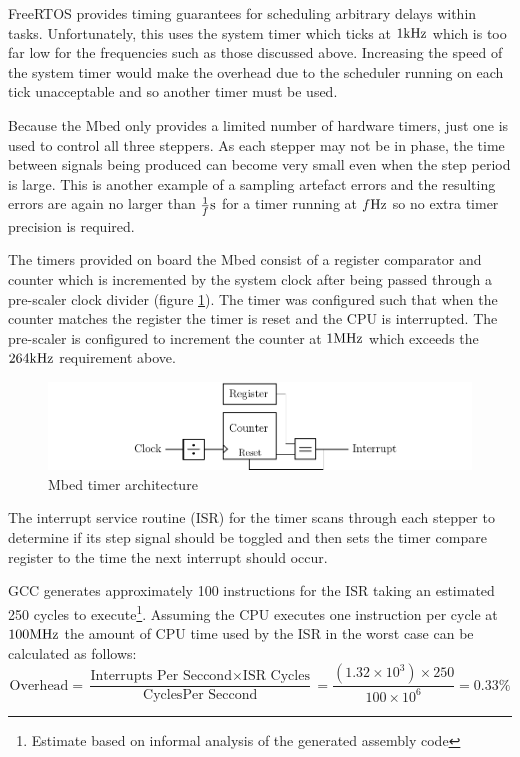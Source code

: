 				FreeRTOS provides timing guarantees for scheduling arbitrary delays
				within tasks. Unfortunately, this uses the system timer which
				ticks at $1\textrm{kHz}$ which is too far low for the frequencies such as those
				discussed above. Increasing the speed of the system timer would make the
				overhead due to the scheduler running on each tick unacceptable and so
				another timer must be used.
				
				Because the Mbed only provides a limited number of hardware timers, just
				one is used to control all three steppers. As each stepper may not be in
				phase, the time between signals being produced can become very small
				even when the step period is large. This is another example of a
				sampling artefact errors and the resulting errors are again no larger
				than $\frac{1}{f}\textrm{s}$ for a timer running at $f\textrm{Hz}$ so no extra timer
				precision is required.
				
				The timers provided on board the Mbed consist of a register comparator
				and counter which is incremented by the system clock after being passed
				through a pre-scaler clock divider (figure \ref{fig:timerArch}). The
				timer was configured such that when the counter matches the register the
				timer is reset and the CPU is interrupted. The pre-scaler is configured
				to increment the counter at $1\textrm{MHz}$ which exceeds the $264\textrm{kHz}$
				requirement above.
				
				\begin{figure}
					\includegraphics[width=1\textwidth]{diagrams/timerArch.pdf}
					\caption{Mbed timer architecture}
					\label{fig:timerArch}
				\end{figure}
				
				The interrupt service routine (ISR) for the timer scans through each
				stepper to determine if its step signal should be toggled and then sets
				the timer compare register to the time the next interrupt should occur.
				
				GCC generates approximately 100 instructions for the ISR taking an
				estimated 250 cycles to execute\footnote{Estimate based on informal
				analysis of the generated assembly code}. Assuming the CPU executes one
				instruction per cycle at $100\textrm{MHz}$ the amount of CPU time used by the
				ISR in the worst case can be calculated as follows:
				\begin{equation}
					\textrm{Overhead} =
					\frac{\textrm{Interrupts Per Seccond} \times \textrm{ISR Cycles}}
					     {\textrm{CyclesPer Seccond}} =
					\frac{(1.32\times10^3) \times 250}
					     {100\times10^6} = 0.33\%
				\end{equation}
				
